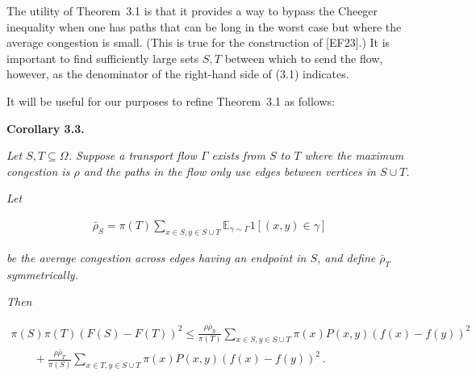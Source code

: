 The utility of Theorem 3.1 is that it provides a way to bypass the Cheeger inequality when one has paths that can be long in the worst case but where the average congestion is small. (This is true for the construction of [EF23].) It is important to find sufficiently large sets $S,T$ between which to send the flow, however, as the denominator of the right-hand side of (3.1) indicates.\par




It will be useful for our purposes to refine Theorem 3.1 as follows:\par





\par\medskip\noindent\textbf{\textbf{Corollary 3.3}\textbf{.}}\par



\emph{Let $S,T\subseteq\Omega$. Suppose a transport flow $\Gamma$ exists from $S$ to $T$ where the maximum congestion is $\rho$ and the paths in the flow only use edges between vertices in $S\cup T$.}\par




\emph{Let}\par


\[\begin{gathered}
\bar{\rho}_{S}=\pi(T)\sum_{x\in S,y\in S\cup T}\mathbb{E}_{\gamma\sim\Gamma}1[(x,y)\in\gamma]
\end{gathered}\]


\emph{be the average congestion across edges having an endpoint in $S$, and define $\bar{\rho}_{T}$ symmetrically.}\par




\emph{Then}\par


\[\begin{gathered}
\displaystyle\pi(S)\pi(T)(F(S)-F(T))^{2} \displaystyle\leq\frac{\rho\bar{\rho}_{S}}{\pi(T)}\sum_{x\in S,y\in S\cup T}\pi(x)P(x,y)(f(x)-f(y))^{2} \\
\displaystyle\quad\quad+\frac{\rho\bar{\rho}_{T}}{\pi(S)}\sum_{x\in T,y\in S\cup T}\pi(x)P(x,y)(f(x)-f(y))^{2}\,.
\end{gathered}\]






